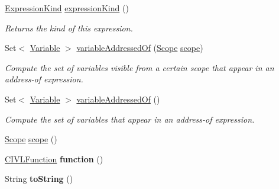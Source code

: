 \begin{DoxyCompactItemize}
\item 
\hyperlink{enumedu_1_1udel_1_1cis_1_1vsl_1_1civl_1_1model_1_1IF_1_1expression_1_1Expression_1_1ExpressionKind}{Expression\+Kind} \hyperlink{classedu_1_1udel_1_1cis_1_1vsl_1_1civl_1_1model_1_1common_1_1expression_1_1CommonFunctionIdentifierExpression_a58d2328ac1be56058506a17c6906a08f}{expression\+Kind} ()
\begin{DoxyCompactList}\small\item\em Returns the kind of this expression. \end{DoxyCompactList}\item 
Set$<$ \hyperlink{interfaceedu_1_1udel_1_1cis_1_1vsl_1_1civl_1_1model_1_1IF_1_1variable_1_1Variable}{Variable} $>$ \hyperlink{classedu_1_1udel_1_1cis_1_1vsl_1_1civl_1_1model_1_1common_1_1expression_1_1CommonFunctionIdentifierExpression_a70f95d1f7856de424896157b9feaa8af}{variable\+Addressed\+Of} (\hyperlink{interfaceedu_1_1udel_1_1cis_1_1vsl_1_1civl_1_1model_1_1IF_1_1Scope}{Scope} \hyperlink{classedu_1_1udel_1_1cis_1_1vsl_1_1civl_1_1model_1_1common_1_1expression_1_1CommonFunctionIdentifierExpression_a05396adb5635fe19b585ced8e3f1cfaa}{scope})
\begin{DoxyCompactList}\small\item\em Compute the set of variables visible from a certain scope that appear in an address-\/of expression. \end{DoxyCompactList}\item 
Set$<$ \hyperlink{interfaceedu_1_1udel_1_1cis_1_1vsl_1_1civl_1_1model_1_1IF_1_1variable_1_1Variable}{Variable} $>$ \hyperlink{classedu_1_1udel_1_1cis_1_1vsl_1_1civl_1_1model_1_1common_1_1expression_1_1CommonFunctionIdentifierExpression_a911c761e0ca61f6685cfe9fa8089e29b}{variable\+Addressed\+Of} ()
\begin{DoxyCompactList}\small\item\em Compute the set of variables that appear in an address-\/of expression. \end{DoxyCompactList}\item 
\hyperlink{interfaceedu_1_1udel_1_1cis_1_1vsl_1_1civl_1_1model_1_1IF_1_1Scope}{Scope} \hyperlink{classedu_1_1udel_1_1cis_1_1vsl_1_1civl_1_1model_1_1common_1_1expression_1_1CommonFunctionIdentifierExpression_a05396adb5635fe19b585ced8e3f1cfaa}{scope} ()
\item 
\hypertarget{classedu_1_1udel_1_1cis_1_1vsl_1_1civl_1_1model_1_1common_1_1expression_1_1CommonFunctionIdentifierExpression_aedbd1034024078cea5d20fa4bec0f0d4}{}\hyperlink{interfaceedu_1_1udel_1_1cis_1_1vsl_1_1civl_1_1model_1_1IF_1_1CIVLFunction}{C\+I\+V\+L\+Function} {\bfseries function} ()\label{classedu_1_1udel_1_1cis_1_1vsl_1_1civl_1_1model_1_1common_1_1expression_1_1CommonFunctionIdentifierExpression_aedbd1034024078cea5d20fa4bec0f0d4}

\item 
\hypertarget{classedu_1_1udel_1_1cis_1_1vsl_1_1civl_1_1model_1_1common_1_1expression_1_1CommonFunctionIdentifierExpression_af71a5258da5fd1959129d7c9ddb9df60}{}String {\bfseries to\+String} ()\label{classedu_1_1udel_1_1cis_1_1vsl_1_1civl_1_1model_1_1common_1_1expression_1_1CommonFunctionIdentifierExpression_af71a5258da5fd1959129d7c9ddb9df60}

\end{DoxyCompactItemize}
